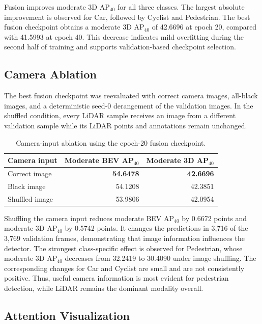Fusion improves moderate 3D AP$_{40}$ for all three classes. The largest
absolute improvement is observed for Car, followed by Cyclist and Pedestrian.
The best fusion checkpoint obtains a moderate 3D AP$_{40}$ of 42.6696 at epoch
20, compared with 41.5993 at epoch 40. This decrease indicates mild
overfitting during the second half of training and supports validation-based
checkpoint selection.

\subsection{Camera Ablation}

The best fusion checkpoint was reevaluated with correct camera images,
all-black images, and a deterministic seed-0 derangement of the validation
images. In the shuffled condition, every LiDAR sample receives an image from
a different validation sample while its LiDAR points and annotations remain
unchanged.

\begin{table}[ht]
\centering
\caption{Camera-input ablation using the epoch-20 fusion checkpoint.}
\label{tab:camera_ablation}
\begin{tabular}{lrr}
\hline
Camera input & Moderate BEV AP$_{40}$ & Moderate 3D AP$_{40}$ \\
\hline
Correct image & \textbf{54.6478} & \textbf{42.6696} \\
Black image & 54.1208 & 42.3851 \\
Shuffled image & 53.9806 & 42.0954 \\
\hline
\end{tabular}
\end{table}

Shuffling the camera input reduces moderate BEV AP$_{40}$ by 0.6672 points
and moderate 3D AP$_{40}$ by 0.5742 points. It changes the predictions in
3,716 of the 3,769 validation frames, demonstrating that image information
influences the detector. The strongest class-specific effect is observed for
Pedestrian, whose moderate 3D AP$_{40}$ decreases from 32.2419 to 30.4090
under image shuffling. The corresponding changes for Car and Cyclist are
small and are not consistently positive. Thus, useful camera information is
most evident for pedestrian detection, while LiDAR remains the dominant
modality overall.

\subsection{Attention Visualization}

